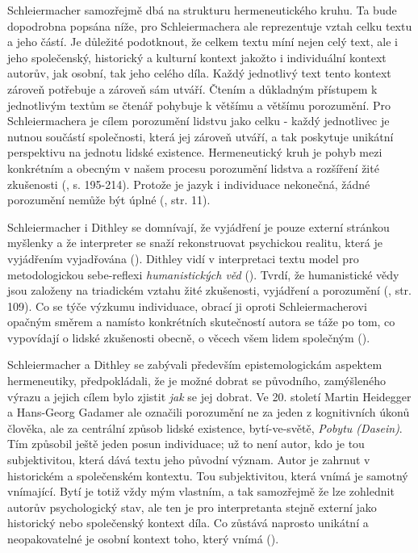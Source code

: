 \documentclass[11pt,a4paper]{article}
\begin{document}
Schleiermacher samozřejmě dbá na strukturu hermeneutického kruhu. Ta bude dopodrobna popsána níže, pro Schleiermachera ale reprezentuje vztah celku textu a jeho částí. Je důležité podotknout, že celkem textu míní nejen celý text, ale i jeho společenský, historický a kulturní kontext jakožto i individuální kontext autorův, jak osobní, tak jeho celého díla. Každý jednotlivý text tento kontext zároveň potřebuje a zároveň sám utváří. Čtením a důkladným přístupem k jednotlivým textům se čtenář pohybuje k většímu a většímu porozumění. Pro Schleiermachera je cílem porozumění lidstvu jako celku - každý jednotlivec je nutnou součástí společnosti, která jej zároveň utváří, a tak poskytuje unikátní perspektivu na jednotu lidské existence. Hermeneutický kruh je pohyb mezi konkrétním a obecným v našem procesu porozumění lidstva a rozšíření žité zkušenosti (\cite{schleiermacher_hermeneutics_1977}, s. 195-214). Protože je jazyk i individuace nekonečná, žádné porozumění nemůže být úplné (\cite{schleiermacher_hermeneutics_1998}, str. 11). 

Schleiermacher i Dithley se domnívají, že vyjádření je pouze externí stránkou myšlenky a že interpreter se snaží rekonstruovat psychickou realitu, která je vyjádřením vyjadřována (\cite{schleiermacher_hermeneutics_1998, dilthey_rise_1972}). Dithley vidí v interpretaci textu model pro metodologickou sebe-reflexi \textit{humanistických věd} (\cite{dilthey_rise_1972}). Tvrdí, že humanistické vědy jsou založeny na triadickém vztahu žité zkušenosti, vyjádření a porozumění (\cite{dilthey_wilhelm_2021}, str. 109). Co se týče výzkumu individuace, obrací ji oproti Schleiermacherovi opačným směrem a namísto konkrétních skutečností autora se táže po tom, co vypovídají o lidské zkušenosti obecně, o věcech všem lidem společným (\cite{stocker_palgrave_2018}). 

Schleiermacher a Dithley se zabývali především epistemologickám aspektem hermeneutiky, předpokládali, že je možné dobrat se původního, zamýšleného výrazu a jejich cílem bylo zjistit \textit{jak} se jej dobrat. Ve 20. století Martin Heidegger a Hans-Georg Gadamer ale označili porozumění ne za jeden z kognitivních úkonů člověka, ale za centrální způsob lidské existence, bytí-ve-světě, \textit{Pobytu (Dasein)}. Tím způsobil ještě jeden posun individuace; už to není autor, kdo je tou subjektivitou, která dává textu jeho původní význam. Autor je zahrnut v historickém a společenském kontextu. Tou subjektivitou, která vnímá je samotný vnímající. Bytí je totiž vždy mým vlastním, a tak samozřejmě že lze zohlednit autorův psychologický stav, ale ten je pro interpretanta stejně externí jako historický nebo společenský kontext díla. Co zůstává naprosto unikátní a neopakovatelné je osobní kontext toho, který vnímá (\cite{petricek_uvod_1992, heidegger_byti_2002}). 
\end{document}
